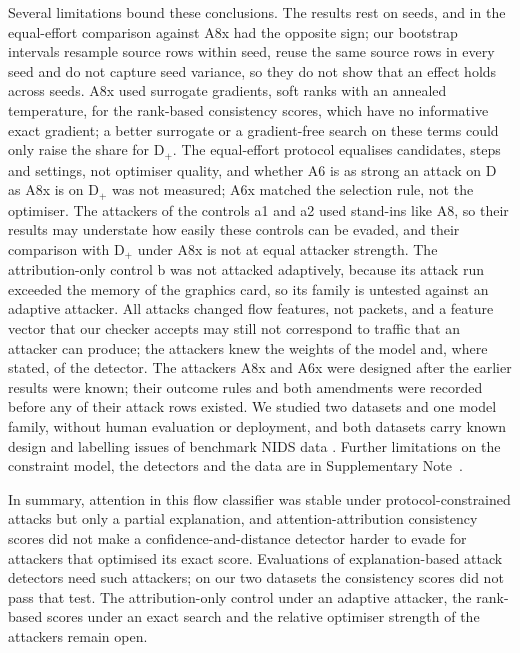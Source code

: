 Several limitations bound these conclusions.
The results rest on \nSeeds{} seeds, and in the equal-effort comparison against A8x \axHeadOppSeedsPhrase{} had the
opposite sign; our bootstrap intervals resample source rows within seed, reuse the same source rows in every seed and
do not capture seed variance, so they do not show that an effect holds across seeds.
A8x used surrogate gradients, soft ranks with an annealed temperature, for the \nRankScores{} rank-based consistency
scores, which have no informative exact gradient; a better surrogate or a gradient-free search on these terms could
only raise the share for D$_+$.
The equal-effort protocol equalises candidates, steps and settings, not optimiser quality, and whether A6 is as strong
an attack on D as A8x is on D$_+$ was not measured; A6x matched the selection rule, not the optimiser.
The attackers of the controls a1 and a2 used stand-ins like A8, so their results may understate how easily these
controls can be evaded, and their comparison with D$_+$ under A8x is not at equal attacker strength.
The attribution-only control b was not attacked adaptively, because its attack run exceeded the memory of the graphics
card, so its family is untested against an adaptive attacker.
All attacks changed flow features, not packets, and a feature vector that our checker accepts may still not correspond
to traffic that an attacker can produce; the attackers knew the weights of the model and, where stated, of the
detector.
The attackers A8x and A6x were designed after the earlier results were known; their outcome rules and both amendments
were recorded before any of their attack rows existed.
We studied two datasets and one model family, without human evaluation or deployment, and both datasets carry known
design and labelling issues of benchmark NIDS data \cite{flood2024,lanvin2022}.
Further limitations on the constraint model, the detectors and the data are in Supplementary
Note~\suppNoteLimits.

In summary, attention in this flow classifier was stable under protocol-constrained attacks but only a partial
explanation, and attention-attribution consistency scores did not make a confidence-and-distance detector harder to
evade for attackers that optimised its exact score.
Evaluations of explanation-based attack detectors need such attackers; on our two datasets the consistency scores did
not pass that test.
The attribution-only control under an adaptive attacker, the rank-based scores under an exact search and the relative
optimiser strength of the attackers remain open.
